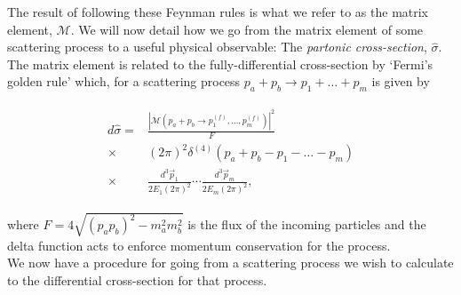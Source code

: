 	The result of following these Feynman rules is what we refer to as the matrix element, $\mathcal{M}$.  We will now detail how
	we go from the matrix element of some scattering process to a useful physical observable: The \emph{partonic cross-section},
	$\hat{\sigma}$.  The matrix element is related to the fully-differential cross-section by `Fermi's golden rule' which, for
	a scattering process $p_{a} + p_{b}\rightarrow p_{1} + \ldots + p_{m}$ is given by

	\begin{align}
	\begin{split}
		d\hat{\sigma} = &\frac{|\mathcal{M}(p_{a} + p_{b}\rightarrow p_{1}^{(f)}, \ldots, p_{m}^{(f)})|^2}{F}\\
		\times&(2\pi)^2\delta^{(4)}(p_{a} + p_{b} - p_{1} - \ldots - p_{m}) \\
		\times&\frac{d^3\vec{p}_1}{2E_1(2\pi)^2}\cdots\frac{d^3\vec{p}_m}{2E_m(2\pi)^2},
	\end{split}
	\end{align}

	where $F=4\sqrt{(p_ap_b)^2 - m_a^2m_b^2}$ is the flux of the incoming particles and the delta function acts to
	enforce momentum conservation for the process.\\We now have a procedure for going from a scattering process
	we wish to calculate to the differential cross-section for that process.

